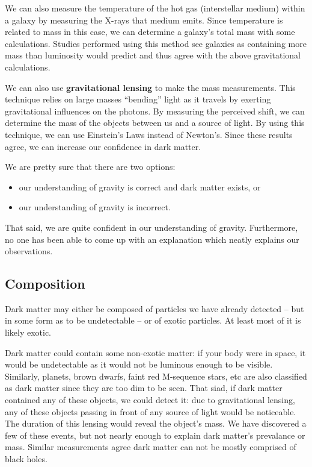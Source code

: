 We can also measure the temperature of the hot gas (interstellar medium) within a galaxy by measuring the X-rays that medium emits. Since temperature is related to mass in this case, we can determine a galaxy's total mass with some calculations. Studies performed using this method see galaxies as containing more mass than luminosity would predict and thus agree with the above gravitational calculations.

We can also use {\bf gravitational lensing} to make the mass measurements. This technique relies on large masses ``bending'' light as it travels by exerting gravitational influences on the photons. By measuring the perceived shift, we can determine the mass of the objects between us and a source of light. By using this technique, we can use Einstein's Laws instead of Newton's. Since these results agree, we can increase our confidence in dark matter.

We are pretty sure that there are two options:
\begin{itemize}
\item our understanding of gravity is correct and dark matter exists, or
\item our understanding of gravity is incorrect.
\end{itemize}

That said, we are quite confident in our understanding of gravity. Furthermore, no one has been able to come up with an explanation which neatly explains our observations.

\subsection{Composition}
Dark matter may either be composed of particles we have already detected -- but in some form as to be undetectable -- or of exotic particles. At least most of it is likely exotic.

Dark matter could contain some non-exotic matter: if your body were in space, it would be undetectable as it would not be luminous enough to be visible. Similarly, planets, brown dwarfs, faint red M-sequence stars, etc are also classified as dark matter since they are too dim to be seen. That siad, if dark matter contained any of these objects, we could detect it: due to gravitational lensing, any of these objects passing in front of any source of light would be noticeable. The duration of this lensing would reveal the object's mass. We have discovered a few of these events, but not nearly enough to explain dark matter's prevalance or mass. Similar measurements agree dark matter can not be mostly comprised of black holes.

